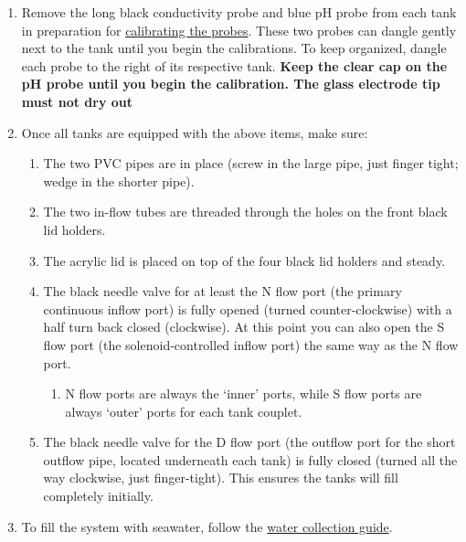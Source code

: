 \documentclass[
]{book}
\providecommand{\tightlist}{%
  \setlength{\itemsep}{0pt}\setlength{\parskip}{0pt}}
\begin{document}
\begin{enumerate}
\def\labelenumi{\arabic{enumi}.}
\tightlist
\item
  Remove the long black conductivity probe and blue pH probe from each tank in preparation for \protect\hyperlink{probe_calibrations}{calibrating the probes}. These two probes can dangle gently next to the tank until you begin the calibrations. To keep organized, dangle each probe to the right of its respective tank. \textbf{Keep the clear cap on the pH probe until you begin the calibration. The glass electrode tip must not dry out}
\item
  Once all tanks are equipped with the above items, make sure:

  \begin{enumerate}
  \def\labelenumii{\arabic{enumii}.}
  \tightlist
  \item
    The two PVC pipes are in place (screw in the large pipe, just finger tight; wedge in the shorter pipe).
  \item
    The two in-flow tubes are threaded through the holes on the front black lid holders.
  \item
    The acrylic lid is placed on top of the four black lid holders and steady.
  \item
    The black needle valve for at least the N flow port (the primary continuous inflow port) is fully opened (turned counter-clockwise) with a half turn back closed (clockwise). At this point you can also open the S flow port (the solenoid-controlled inflow port) the same way as the N flow port.

    \begin{enumerate}
    \def\labelenumiii{\arabic{enumiii}.}
    \tightlist
    \item
      N flow ports are always the `inner' ports, while S flow ports are always `outer' ports for each tank couplet.
    \end{enumerate}
  \item
    The black needle valve for the D flow port (the outflow port for the short outflow pipe, located underneath each tank) is fully closed (turned all the way clockwise, just finger-tight). This ensures the tanks will fill completely initially.
  \end{enumerate}
\item
  To fill the system with seawater, follow the \href{06-water_collection.rmd}{water collection guide}.


\end{enumerate}
\end{document}
